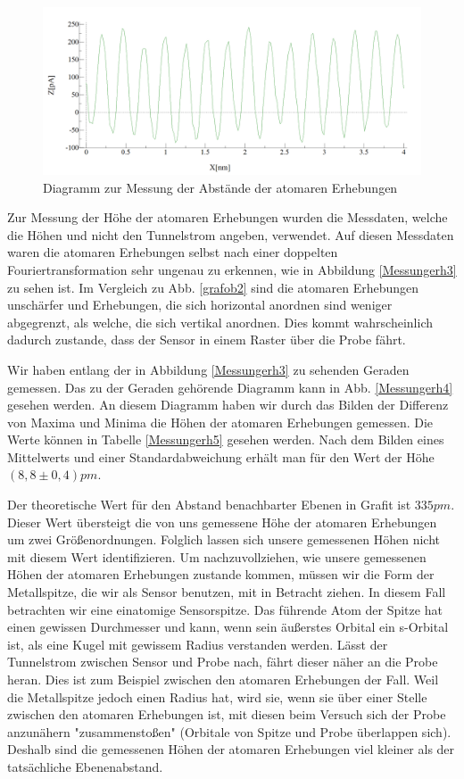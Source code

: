 \documentclass[10pt,a4paper]{article}
\begin{document}
\begin{figure}[h]
	\centering
	
	\includegraphics[scale = 0.3]{Aufnahme_Ebene_doppelte_fourier.png}
	
	\caption{Diagramm zur Messung der Abstände der atomaren Erhebungen}
	\label{Messungerh2}
\end{figure}

Zur Messung der Höhe der atomaren Erhebungen wurden die Messdaten, welche die Höhen und nicht den Tunnelstrom angeben, verwendet. Auf diesen Messdaten waren die atomaren Erhebungen selbst nach einer doppelten Fouriertransformation sehr ungenau zu erkennen, wie in Abbildung \ref{Messungerh3} zu sehen ist. Im Vergleich zu Abb. \ref{grafob2} sind die atomaren Erhebungen unschärfer und Erhebungen, die sich horizontal anordnen sind weniger abgegrenzt, als welche, die sich vertikal anordnen. Dies kommt wahrscheinlich dadurch zustande, dass der Sensor in einem Raster über die Probe fährt.

 Wir haben entlang der in Abbildung \ref{Messungerh3} zu sehenden Geraden gemessen. Das zu der Geraden gehörende Diagramm kann in Abb. \ref{Messungerh4} gesehen werden. An diesem Diagramm haben wir durch das Bilden der Differenz von Maxima und Minima die Höhen der atomaren Erhebungen gemessen. Die Werte können in Tabelle \ref{Messungerh5} gesehen werden. Nach dem Bilden eines Mittelwerts und einer Standardabweichung erhält man für den Wert der Höhe $(8,8 \pm 0,4) pm$.

Der theoretische Wert für den Abstand benachbarter Ebenen in Grafit ist $335 pm$. Dieser Wert übersteigt die von uns gemessene Höhe der atomaren Erhebungen um zwei Größenordnungen. Folglich lassen sich unsere gemessenen Höhen nicht mit diesem Wert identifizieren. Um nachzuvollziehen, wie unsere gemessenen Höhen der atomaren Erhebungen zustande kommen, müssen wir die Form der Metallspitze, die wir als Sensor benutzen, mit in Betracht ziehen. In diesem Fall betrachten wir eine einatomige Sensorspitze. Das führende Atom der Spitze hat einen gewissen Durchmesser und kann, wenn sein äußerstes Orbital ein s-Orbital ist, als eine Kugel mit gewissem Radius verstanden werden. Lässt der Tunnelstrom zwischen Sensor und Probe nach, fährt dieser näher an die Probe heran. Dies ist zum Beispiel zwischen den atomaren Erhebungen der Fall. Weil die Metallspitze jedoch einen Radius hat, wird sie, wenn sie über einer Stelle zwischen den atomaren Erhebungen ist, mit diesen beim Versuch sich der Probe anzunähern "zusammenstoßen" (Orbitale von Spitze und Probe überlappen sich). Deshalb sind die gemessenen Höhen der atomaren Erhebungen viel kleiner als der tatsächliche Ebenenabstand.
\end{document}
